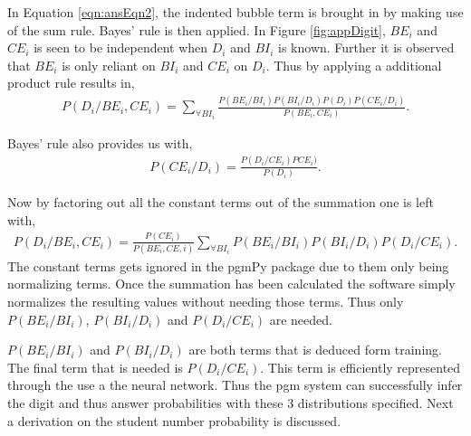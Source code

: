 In Equation \ref{eqn:ansEqn2}, the indented bubble term is brought in by making use of the sum rule. Bayes' rule is then applied. In Figure \ref{fig:appDigit}, $BE_i$ and $CE_i$ is seen to be independent when $D_i$ and $BI_i$ is known. Further it is observed that $BE_i$ is only reliant on $BI_i$ and $CE_i$ on $D_i$. Thus by applying a additional product rule results in,
\begin{align}
  P(D_i/BE_i,CE_i) =  \sum_{\forall BI_i}^{}\frac{P(BE_i/BI_i)P(BI_i/D_i)P(D_i)P(CE_i/D_i)}{P(BE_i,CE_i)}.
\label{eqn:ansEqn3}
\end{align}

Bayes' rule also provides us with,
\begin{align}
  P(CE_i/D_i)	=  \frac{P(D_i/CE_i)PCE_i)}{P(D_i)}.
\label{eqn:ansEqn4}
\end{align}

Now by factoring out all the constant terms out of the summation one is left with,
\begin{align}
  P(D_i/BE_i,CE_i) =  \frac{P(CE_i)}{P(BE_i,CE,i)}\sum_{\forall BI_i}^{}P(BE_i/BI_i)P(BI_i/D_i)P(D_i/CE_i).
\label{eqn:ansEqn5}
\end{align}
The constant terms gets ignored in the pgmPy package due to them only being normalizing terms. Once the summation has been calculated the software simply normalizes the resulting values without needing those terms. Thus only $P(BE_i/BI_i)$, $P(BI_i/D_i)$ and $P(D_i/CE_i)$ are needed.

$P(BE_i/BI_i)$ and  $P(BI_i/D_i)$ are both terms that is deduced form training. The final term that is needed is $P(D_i/CE_i)$. This term is efficiently represented through the use a the neural network. Thus the pgm system can successfully infer the digit and thus answer probabilities with these 3 distributions specified. Next a derivation on the student number probability is discussed.

